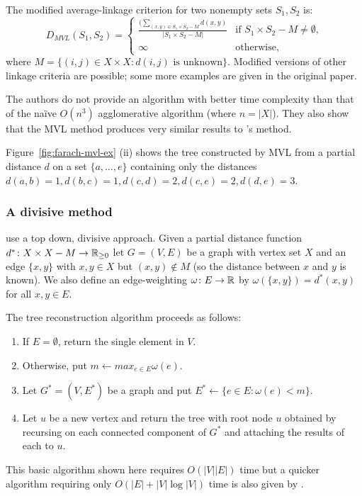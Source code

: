 The modified
average-linkage criterion for two nonempty sets $S_1, S_2$ is:
\begin{equation*}
  D_{MVL}(S_1,S_2) =
  \begin{cases}
    \displaystyle
    \frac{\displaystyle (\sum_{(x,y) \in S_1 \times S_2 - M} d(x,y)}
         {|S_1 \times S_2 - M|} & \text{if $S_1
      \times S_2 - M \neq \emptyset$,} \\
    \infty & \text{otherwise},
  \end{cases}
\end{equation*}
where $M = \{(i,j) \in X \times X \colon d(i,j) \text{ is unknown}\}$.
Modified versions of other linkage criteria are possible; some more examples
are given in the original paper.

The authors do not provide an algorithm with better time complexity than that
of the naïve $O(n^3)$ agglomerative algorithm (where $n = |X|$).  They also
show that the MVL method produces very similar results to
\citeauthor{de1984ultrametric}'s method.

Figure~\ref{fig:farach-mvl-ex} (ii) shows the tree constructed by MVL from a
partial distance $d$ on a set $\{a,\dotsc,e\}$ containing only the distances
$d(a,b)=1, d(b,c)=1, d(c,d)=2, d(c,e)=2, d(d,e)=3$.

\subsubsection{A divisive method}
\label{sec:part-dist-divisive-method}

\cite{farach1995robust} use a top down, divisive approach.  Given a partial
distance function $d^* \colon X \times X - M \to {\mathbb R}_{\geq 0}$ let $G=(V,E)$ be a
graph with vertex set $X$ and an edge $\{x,y\}$ with $x,y \in X$ but $(x,y)
\notin M$ (so the distance between $x$ and $y$ is known).  We also define an
edge-weighting $\omega \colon E \to {\mathbb R}$ by $\omega(\{x,y\}) = d^*(x,y)$ for
all $x,y \in E$.

The tree reconstruction algorithm proceeds as follows:
\begin{enumerate}
\item If $E = \emptyset$, return the single element in $V$.
\item Otherwise, put $m \gets max_{e \in E} \omega(e)$.
\item Let $G^* = (V,E^*)$ be a graph and put $E^* \gets \{e \in E \colon
  \omega(e) < m\}$.
\item Let $u$ be a new vertex and return the tree with root node $u$ obtained
  by recursing on each connected component of $G^*$ and attaching the results
  of each to $u$.               %
\end{enumerate}
This basic algorithm shown here requires $O(|V||E|)$ time but a quicker
algorithm requiring only $O(|E| + |V|\log |V|)$ time is also given by
\cite{farach1995robust}.

